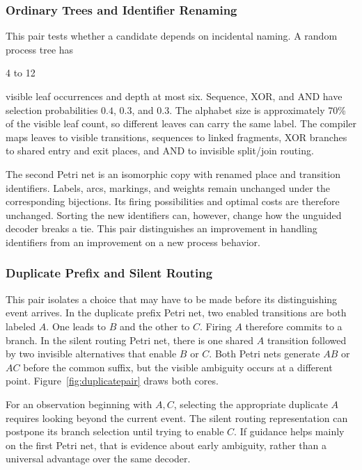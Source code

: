 \subsubsection{Ordinary Trees and Identifier Renaming}

This pair tests whether a candidate depends on incidental naming. A random process tree has \begin{revised}4 to 12\end{revised} visible leaf occurrences and depth at most six. Sequence, XOR, and AND have selection probabilities $0.4$, $0.3$, and $0.3$. The alphabet size is approximately 70\% of the visible leaf count, so different leaves can carry the same label. The compiler maps leaves to visible transitions, sequences to linked fragments, XOR branches to shared entry and exit places, and AND to invisible split/join routing.

The second Petri net is an isomorphic copy with renamed place and transition identifiers. Labels, arcs, markings, and weights remain unchanged under the corresponding bijections. Its firing possibilities and optimal costs are therefore unchanged. Sorting the new identifiers can, however, change how the unguided decoder breaks a tie. This pair distinguishes an improvement in handling identifiers from an improvement on a new process behavior.

\subsubsection{Duplicate Prefix and Silent Routing}

This pair isolates a choice that may have to be made before its distinguishing event arrives. In the duplicate prefix Petri net, two enabled transitions are both labeled $A$. One leads to $B$ and the other to $C$. Firing $A$ therefore commits to a branch. In the silent routing Petri net, there is one shared $A$ transition followed by two invisible alternatives that enable $B$ or $C$. Both Petri nets generate $AB$ or $AC$ before the common suffix, but the visible ambiguity occurs at a different point. Figure~\ref{fig:duplicatepair} draws both cores.

For an observation beginning with $A,C$, selecting the appropriate duplicate $A$ requires looking beyond the current event. The silent routing representation can postpone its branch selection until trying to enable $C$. If guidance helps mainly on the first Petri net, that is evidence about early ambiguity, rather than a universal advantage over the same decoder.

